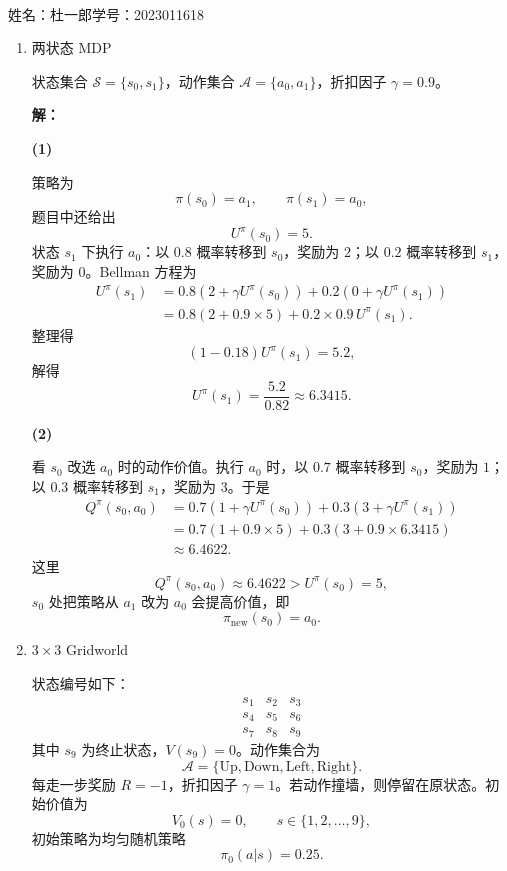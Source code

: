 \documentclass[a4paper]{article}
\makeatletter
\newcommand{\courseheader}{
        \begin{center}
            {\Large \heiti \@courseinstitute \quad \@coursename}\\[0.5em]
            {\large \@term \quad \@hwname 8 \quad \@slname}
        \end{center}
        \vspace{1em}
    }
\newcommand{\name}[1]{\noindent #1 \par\vspace{1em}}
\newenvironment{solution}{\par\noindent\textbf{解：}\par}{\par}
\makeatother
\begin{document}
\courseheader
\name{姓名：杜一郎\qquad 学号：2023011618}

\begin{enumerate}
\setlength{\itemsep}{3\parskip}

\item 两状态 MDP

状态集合 \(\mathcal S=\{s_0,s_1\}\)，动作集合
\(\mathcal A=\{a_0,a_1\}\)，折扣因子 \(\gamma=0.9\)。

\begin{solution}
\textbf{(1)}

策略为
\[
\pi(s_0)=a_1,\qquad \pi(s_1)=a_0,
\]
题目中还给出
\[
U^\pi(s_0)=5.
\]
状态 \(s_1\) 下执行 \(a_0\)：以 \(0.8\) 概率转移到 \(s_0\)，奖励为 \(2\)；以 \(0.2\) 概率转移到 \(s_1\)，奖励为 \(0\)。Bellman 方程为
\[
\begin{aligned}
U^\pi(s_1)
&=0.8\left(2+\gamma U^\pi(s_0)\right)
  +0.2\left(0+\gamma U^\pi(s_1)\right)\\
&=0.8(2+0.9\times 5)+0.2\times0.9\,U^\pi(s_1).
\end{aligned}
\]
整理得
\[
(1-0.18)U^\pi(s_1)=5.2,
\]
解得
\[
U^\pi(s_1)=\frac{5.2}{0.82}\approx 6.3415.
\]

\textbf{(2)}

看 \(s_0\) 改选 \(a_0\) 时的动作价值。执行 \(a_0\) 时，以 \(0.7\) 概率转移到 \(s_0\)，奖励为 \(1\)；以 \(0.3\) 概率转移到 \(s_1\)，奖励为 \(3\)。于是
\[
\begin{aligned}
Q^\pi(s_0,a_0)
&=0.7\left(1+\gamma U^\pi(s_0)\right)
 +0.3\left(3+\gamma U^\pi(s_1)\right)\\
&=0.7(1+0.9\times5)
 +0.3(3+0.9\times6.3415)\\
&\approx 6.4622.
\end{aligned}
\]
这里
\[
Q^\pi(s_0,a_0)\approx 6.4622 > U^\pi(s_0)=5,
\]
\(s_0\) 处把策略从 \(a_1\) 改为 \(a_0\) 会提高价值，即
\[
\pi_{\mathrm{new}}(s_0)=a_0.
\]
\end{solution}

\item \(3\times3\) Gridworld

状态编号如下：
\[
\begin{matrix}
s_1&s_2&s_3\\
s_4&s_5&s_6\\
s_7&s_8&s_9
\end{matrix}
\]
其中 \(s_9\) 为终止状态，\(V(s_9)=0\)。动作集合为
\[
\mathcal A=\{\mathrm{Up},\mathrm{Down},\mathrm{Left},\mathrm{Right}\}.
\]
每走一步奖励 \(R=-1\)，折扣因子 \(\gamma=1\)。若动作撞墙，则停留在原状态。初始价值为
\[
V_0(s)=0,\qquad s\in\{1,2,\ldots,9\},
\]
初始策略为均匀随机策略
\[
\pi_0(a|s)=0.25.
\]


\end{enumerate}
\end{document}

